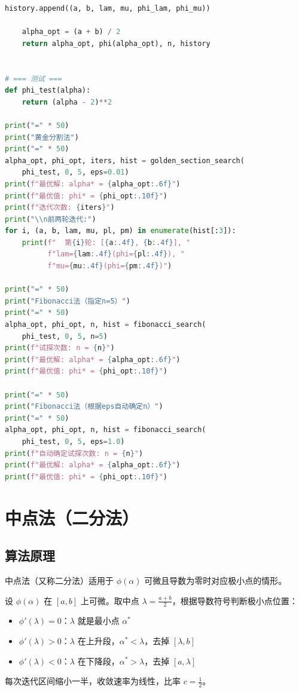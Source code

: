 \begin{lstlisting}[language=Python, caption=黄金分割法与Fibonacci法实现]
        history.append((a, b, lam, mu, phi_lam, phi_mu))
    
    alpha_opt = (a + b) / 2
    return alpha_opt, phi(alpha_opt), n, history


# === 测试 ===
def phi_test(alpha):
    return (alpha - 2)**2

print("=" * 50)
print("黄金分割法")
print("=" * 50)
alpha_opt, phi_opt, iters, hist = golden_section_search(
    phi_test, 0, 5, eps=0.01)
print(f"最优解: alpha* = {alpha_opt:.6f}")
print(f"最优值: phi* = {phi_opt:.10f}")
print(f"迭代次数: {iters}")
print("\\n前两轮迭代:")
for i, (a, b, lam, mu, pl, pm) in enumerate(hist[:3]):
    print(f"  第{i}轮: [{a:.4f}, {b:.4f}], "
          f"lam={lam:.4f}(phi={pl:.4f}), "
          f"mu={mu:.4f}(phi={pm:.4f})")

print("=" * 50)
print("Fibonacci法（指定n=5）")
print("=" * 50)
alpha_opt, phi_opt, n, hist = fibonacci_search(
    phi_test, 0, 5, n=5)
print(f"试探次数: n = {n}")
print(f"最优解: alpha* = {alpha_opt:.6f}")
print(f"最优值: phi* = {phi_opt:.10f}")

print("=" * 50)
print("Fibonacci法（根据eps自动确定n）")
print("=" * 50)
alpha_opt, phi_opt, n, hist = fibonacci_search(
    phi_test, 0, 5, eps=1.0)
print(f"自动确定试探次数: n = {n}")
print(f"最优解: alpha* = {alpha_opt:.6f}")
print(f"最优值: phi* = {phi_opt:.10f}")
\end{lstlisting}

\section{中点法（二分法）}\label{sec:ch4-bisection}

\subsection{算法原理}

中点法（又称二分法）适用于 $\phi(\alpha)$ 可微且导数为零时对应极小点的情形。

\begin{conceptbox}[二分法原理]
设 $\phi(\alpha)$ 在 $[a, b]$ 上可微。取中点 $\lambda = \frac{a+b}{2}$，根据导数符号判断极小点位置：
\begin{itemize}
    \item $\phi'(\lambda) = 0$：$\lambda$ 就是最小点 $\alpha^*$
    \item $\phi'(\lambda) > 0$：$\lambda$ 在上升段，$\alpha^* < \lambda$，去掉 $[\lambda, b]$
    \item $\phi'(\lambda) < 0$：$\lambda$ 在下降段，$\alpha^* > \lambda$，去掉 $[a, \lambda]$
\end{itemize}
每次迭代区间缩小一半，收敛速率为线性，比率 $c = \frac{1}{2}$。
\end{conceptbox}

